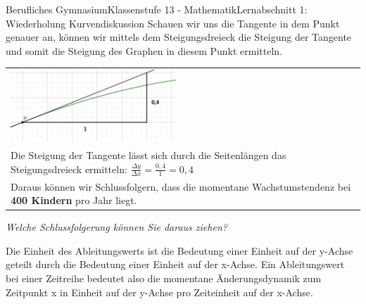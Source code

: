 \documentclass[11pt,twocolumn,oneside,openany,headings=optiontotoc,11pt,numbers=noenddot]{article}
\begin{document}
\begin{worksheet}{Berufliches Gymnasium}{Klassenstufe 13 - Mathematik}{Lernabschnitt 1: Wiederholung Kurvendiskussion}
		Schauen wir uns die Tangente in dem Punkt genauer an, können wir mittels dem Steigungsdreieck die Steigung der Tangente und somit die Steigung des Graphen in diesem Punkt ermitteln.\\
		\par\bigskip\noindent
		\begin{tabularx}{0.48\textwidth}{X}
			\includegraphics[width=0.48\textwidth]{../99_Bilder/00_Wdh/KiTa2.png}\\
			Die Steigung der Tangente lässt sich durch die Seitenlängen das Steigungsdreieck ermitteln: \(\frac{\Delta{}y}{\Delta{}x}= \frac{0,4}{1} = 0,4\)\\
			Daraus können wir Schlussfolgern, dass die momentane Wachstumstendenz bei \textbf{400 Kindern} pro Jahr liegt.\\
		\end{tabularx}
		\par\bigskip\noindent
		\textit{Welche Schlussfolgerung können Sie daraus ziehen?}\\
		\par\bigskip\noindent
		\begin{framed}
			Die Einheit des Ableitungswerts ist die Bedeutung einer Einheit auf der y-Achse geteilt durch die Bedeutung einer Einheit auf der x-Achse. Ein Ableitungswert bei einer Zeitreihe bedeutet also die momentane Änderungsdynamik zum Zeitpunkt x in \glqq{}Einheit auf der y-Achse\grqq{} pro \glqq{}Zeiteinheit auf der x-Achse\grqq{}.
		\end{framed}

\end{worksheet}
\end{document}
